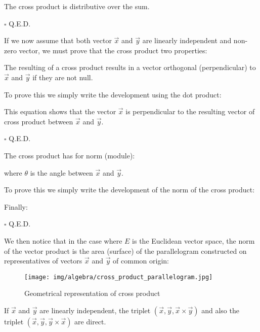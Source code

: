	\begin{theorem}
	The cross product is distributive over the sum.
	\end{theorem}
	\begin{dem}
	
	\begin{flushright}
		$\square$  Q.E.D.
	\end{flushright}
	\end{dem}
	
	If we now assume that both vector $\vec{x}$ and $\vec{y}$ are linearly independent and non-zero vector, we must prove that the cross product two properties:
	\begin{theorem}
	The resulting of a cross product results in a vector orthogonal (perpendicular) to $\vec{x}$ and $\vec{y}$ if they are not null.
	\end{theorem}
	\begin{dem}
	To prove this we simply write the development using the dot product:
	
	This equation shows that the vector $\vec{x}$ is perpendicular to the resulting vector of cross product between $\vec{x}$ and $\vec{y}$.
	\begin{flushright}
		$\square$  Q.E.D.
	\end{flushright}
	\end{dem}
	\begin{theorem}
	The cross product has for norm (module):
	
	where $\theta$ is the angle between $\vec{x}$ and $\vec{y}$.
	\end{theorem}
	\begin{dem}
		To prove this we simply write the development of the norm of the cross product:
		
		Finally:
		
	\begin{flushright}
		$\square$  Q.E.D.
	\end{flushright}
	\end{dem}
	We then notice that in the case where $E$ is the Euclidean vector space, the norm of the vector product is the area (surface) of the parallelogram constructed on representatives of vectors $\vec{x}$ and $\vec{y}$ of common origin:
	\begin{figure}[H]
		\centering
		\texttt{[image: img/algebra/cross\_product\_parallelogram.jpg]}
		\caption{Geometrical representation of cross product}
	\end{figure}
	If $\vec{x}$ and $\vec{y}$ are linearly independent, the triplet $(\vec{x},\vec{y},\vec{x}\times \vec{y})$ and also the triplet $(\vec{x},\vec{y},\vec{y}\times \vec{x})$ are direct.
	
